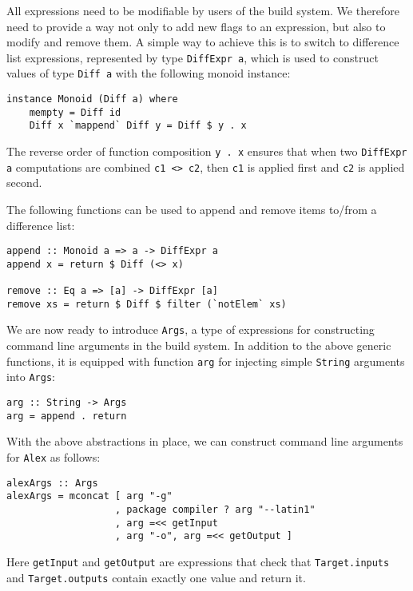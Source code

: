 All expressions need to be modifiable by users of the build system. We therefore
need to provide a way not only to add new flags to an expression, but also to
modify and remove them. A simple way to achieve this is to switch to difference
list expressions, represented by type \texttt{DiffExpr a}, which is used to
construct values of type \texttt{Diff a} with the following monoid instance:

\begin{lstlisting}[basicstyle=\ttfamily]
instance Monoid (Diff a) where
    mempty = Diff id
    Diff x `mappend` Diff y = Diff $ y . x
\end{lstlisting}

The reverse order of function composition \texttt{y . x} ensures that when two
\texttt{DiffExpr a} computations are combined \texttt{c1 <> c2}, then
\texttt{c1} is applied first and \texttt{c2} is applied second.

The following functions can be used to append and remove items to/from a
difference list:

\begin{lstlisting}[basicstyle=\ttfamily]
append :: Monoid a => a -> DiffExpr a
append x = return $ Diff (<> x)

remove :: Eq a => [a] -> DiffExpr [a]
remove xs = return $ Diff $ filter (`notElem` xs)
\end{lstlisting}

We are now ready to introduce \texttt{Args}, a type of expressions for
constructing command line arguments in the build system. In addition to the
above generic functions, it is equipped with function \texttt{arg} for injecting
simple \texttt{String} arguments into \texttt{Args}:

\begin{lstlisting}[basicstyle=\ttfamily]
arg :: String -> Args
arg = append . return
\end{lstlisting}

With the above abstractions in place, we can construct command line arguments
for \texttt{Alex} as follows:

\begin{lstlisting}[basicstyle=\ttfamily]
alexArgs :: Args
alexArgs = mconcat [ arg "-g"
                   , package compiler ? arg "--latin1"
                   , arg =<< getInput
                   , arg "-o", arg =<< getOutput ]
\end{lstlisting}

Here \texttt{getInput} and \texttt{getOutput} are expressions that check that
\texttt{Target.inputs} and \texttt{Target.outputs} contain exactly one value and
return it.

